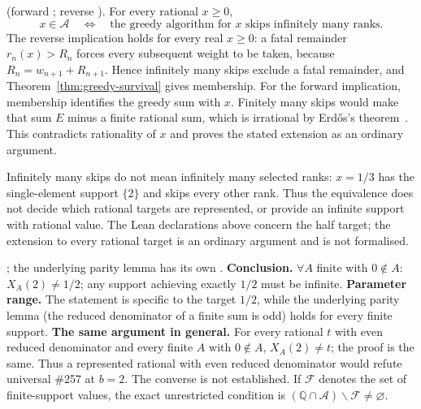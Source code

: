\begin{obs}
(forward ; reverse
).
For every rational $x\ge0$,
\[
 x\in\mathcal A\quad\Longleftrightarrow\quad
 \text{the greedy algorithm for $x$ skips infinitely many ranks}.
\]
The reverse implication holds for every real $x\ge0$:
a fatal remainder $r_n(x)>R_n$ forces every subsequent weight to
be taken, because $R_n=w_{n+1}+R_{n+1}$.
Hence infinitely many skips exclude a fatal remainder, and
Theorem~\ref{thm:greedy-survival} gives membership.
For the forward implication, membership identifies the greedy
sum with $x$.  Finitely many skips would make that sum $E$ minus
a finite rational sum, which is irrational by
Erd\H{o}s's theorem~\cite{erdos1948}.  This contradicts rationality
of $x$ and proves the stated extension as an ordinary argument.

Infinitely many skips do not mean infinitely many selected ranks:
$x=1/3$ has the single-element support $\{2\}$ and skips every
other rank.  Thus the equivalence does not decide which rational
targets are represented, or provide an infinite support with rational
value.  The Lean declarations above concern the half target; the
extension to every rational target is an ordinary argument and is not
formalised.
\end{obs}

\begin{obs}
; the underlying parity
lemma has its own .
\textbf{Conclusion.} $\forall A$ finite with $0\notin A$: $X_{A}(2) \ne
1/2$; any support achieving exactly $1/2$ must be infinite.
\textbf{Parameter range.} The statement is specific to the target $1/2$, while the underlying
parity lemma (the reduced denominator of a finite sum is odd) holds for every finite support.
\textbf{The same argument in general.} For every rational $t$ with even reduced denominator
and every finite $A$ with $0\notin A$, $X_{A}(2) \ne t$; the proof is the same. Thus a represented rational with even reduced denominator would refute universal
\#257 at $b=2$. The converse is not established. If $\mathcal F$ denotes the set of finite-support
values, the exact unrestricted condition is
$(\mathbb Q\cap\ensuremath{\mathcal A})\smallsetminus\mathcal F\ne\varnothing$.
\end{obs}

